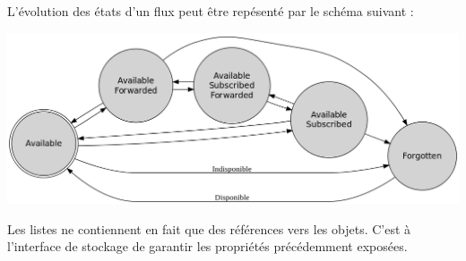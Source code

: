 L'évolution des états d'un flux peut être repésenté par le schéma suivant :

\begin{center}
    \includegraphics[width=1\textwidth]{img/state.png}
\end{center}

Les listes ne contiennent en fait que des références vers les objets. C'est à l'interface de
stockage de garantir les propriétés précédemment exposées. \\

